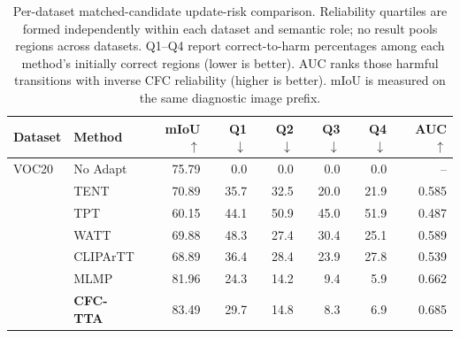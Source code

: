 \begin{table}[t]
\centering
\small
\setlength{\tabcolsep}{4.5pt}
\caption{Per-dataset matched-candidate update-risk comparison. Reliability quartiles are formed independently within each dataset and semantic role; no result pools regions across datasets. Q1--Q4 report correct-to-harm percentages among each method's initially correct regions (lower is better). AUC ranks those harmful transitions with inverse CFC reliability (higher is better). mIoU is measured on the same diagnostic image prefix.}
\label{tab:source-risk-per-dataset}
\begin{tabular}{llrrrrrr}
\toprule
Dataset & Method & mIoU $\uparrow$ & Q1 $\downarrow$ & Q2 $\downarrow$ & Q3 $\downarrow$ & Q4 $\downarrow$ & AUC $\uparrow$ \\
\midrule
VOC20 & No Adapt & 75.79 & 0.0 & 0.0 & 0.0 & 0.0 & -- \\
 & TENT & 70.89 & 35.7 & 32.5 & 20.0 & 21.9 & 0.585 \\
 & TPT & 60.15 & 44.1 & 50.9 & 45.0 & 51.9 & 0.487 \\
 & WATT & 69.88 & 48.3 & 27.4 & 30.4 & 25.1 & 0.589 \\
 & CLIPArTT & 68.89 & 36.4 & 28.4 & 23.9 & 27.8 & 0.539 \\
 & MLMP & 81.96 & 24.3 & 14.2 & 9.4 & 5.9 & 0.662 \\
 & \textbf{CFC-TTA} & 83.49 & 29.7 & 14.8 & 8.3 & 6.9 & 0.685 \\
\bottomrule
\end{tabular}
\end{table}
